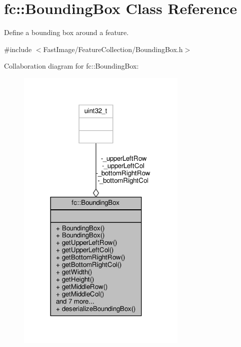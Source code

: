 \hypertarget{classfc_1_1BoundingBox}{}\section{fc\+:\+:Bounding\+Box Class Reference}
\label{classfc_1_1BoundingBox}


Define a bounding box around a feature.  




{\ttfamily \#include $<$Fast\+Image/\+Feature\+Collection/\+Bounding\+Box.\+h$>$}



Collaboration diagram for fc\+:\+:Bounding\+Box\+:
\nopagebreak
\begin{figure}[H]
\begin{center}
\leavevmode
\includegraphics[width=230pt]{df/dd9/classfc_1_1BoundingBox__coll__graph}
\end{center}
\end{figure}
